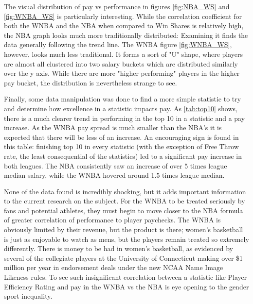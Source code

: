 \documentclass[12pt, titlepage]{article}
\begin{document}
The visual distribution of pay vs performance in figures \ref{fig:NBA_WS} and \ref{fig:WNBA_WS} is particularly interesting. While the correlation coefficient for both the WNBA and the NBA 
when compared to Win Shares is relatively high, the NBA graph looks much more traditionally distributed: Examining it finds the data generally following 
the trend line. The WNBA figure \ref{fig:WNBA_WS}, however, looks much less traditional. It forms a sort of "U" shape, where players are almost all clustered into two salary 
buckets which are distributed similarly over the y axis. While there are more "higher performing" players in the higher pay bucket, the distribution is 
nevertheless strange to see.
\par
Finally, some data manipulation was done to find a more simple statistic to try and determine how excellence in a statistic impacts pay. As \ref{tab:top10} shows, 
there is a much clearer trend in performing in the top 10 in a statistic and a pay increase. As the WNBA pay spread is much smaller than the NBA’s it is 
expected that there will be less of an increase. An encouraging sign is found in this table: finishing top 10 in every statistic (with the exception of 
Free Throw rate, the least consequential of the statistics) led to a significant pay increase in both leagues. The NBA consistently saw an increase of 
over 5 times league median salary, while the WNBA hovered around 1.5 times league median.
\par
None of the data found is incredibly shocking, but it adds important information to the current research on the subject. For the WNBA to be treated 
seriously by fans and potential athletes, they must begin to move closer to the NBA formula of greater correlation of performance to player paychecks. The 
WNBA is obviously limited by their revenue, but the product is there; women’s basketball is just as enjoyable to watch as mens, but the players remain 
treated so extremely differently. There is money to be had in women’s basketball, as evidenced by several of the collegiate players at the University of 
Connecticut making over \$1 million per year in endorsement deals under the new NCAA Name Image Likeness rules. To see such insignificant correlation 
between a statistic like Player Efficiency Rating and pay in the WNBA vs the NBA is eye opening to the gender sport inequality.
\end{document}
